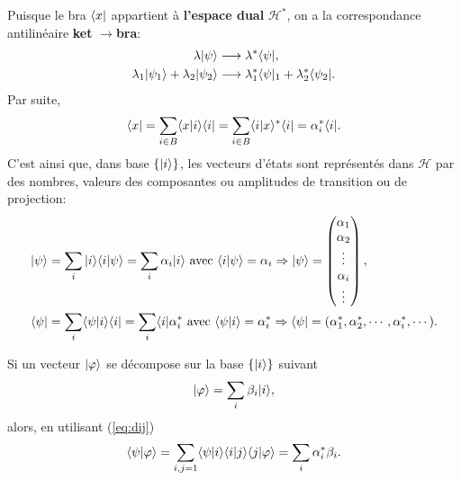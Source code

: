 Puisque le bra $\langle x\vert$ appartient à \textbf{l'espace dual}
$\mathcal{H}^{\ast}$, on a la correspondance antilinéaire \textbf{ket}
$\rightarrow$\textbf{bra}:
\begin{subequations}%
\begin{align}
\lambda\vert\psi\rangle  &  \longrightarrow\lambda^{\ast}\langle\psi\vert,\\
\lambda_1\vert\psi_1\rangle+\lambda_2\vert\psi_2\rangle&
\longrightarrow\lambda_1^{\ast}\langle\psi\vert_1+\lambda_2^{\ast}
\langle\psi_2\vert.
\end{align}%
\end{subequations}%
Par suite,
\begin{equation}
\langle x\vert =\sum_{i\in B}\langle x\vert i\rangle\langle i\vert =\sum_{i\in B}\langle i\vert x\rangle
^{\ast}\langle i\vert =\alpha_{i}^{\ast}\langle i\vert.
\end{equation}
C'est ainsi que, dans base $\{\vert i\rangle\}$, les vecteurs d'états sont représentés
dans $\mathcal{H}$ par des nombres, valeurs des composantes ou amplitudes de
transition ou de projection:
\begin{subequations}%
\begin{align}
\vert\psi\rangle &  =\sum_{i}\vert i\rangle\langle i\vert\psi\rangle=\sum_{i}\alpha_{i}\vert i\rangle
\text{ avec }\langle i\vert\psi\rangle =\alpha_{i}\Rightarrow\vert\psi\rangle =
\begin{pmatrix}
\alpha_1\\
\alpha_2\\
\vdots\\
\alpha_{i}\\
\vdots
\end{pmatrix},\\
\langle\psi\vert &  =\sum_{i}\langle\psi\vert i\rangle\langle i\vert=\sum_{i}\langle i\vert
\alpha_{i}^{\ast}\text{ avec }\langle\psi\vert i\rangle=\alpha_{i}^{\ast}
\Rightarrow\langle\psi\vert=(\alpha_1^{\ast},\alpha_2^{\ast},\cdots,\alpha_{i}^{
\ast},\cdots).
\end{align}%
\end{subequations}%

Si un vecteur $\vert\varphi\rangle$ se décompose sur la base $\{\vert i\rangle\}$ suivant
\begin{equation}
\vert\varphi\rangle =\sum_{i}\beta_{i}\vert i\rangle,
\end{equation}
alors, en utilisant (\ref{eq:dij})%
\begin{equation}
\langle\psi\vert\varphi\rangle =\sum_{i,j=1}\langle\psi\vert i\rangle\langle i\vert
j\rangle\langle j\vert\varphi\rangle=\sum_{i}\alpha_{i}^{\ast}\beta_{i}.
\label{eq:XY2}
\end{equation}

